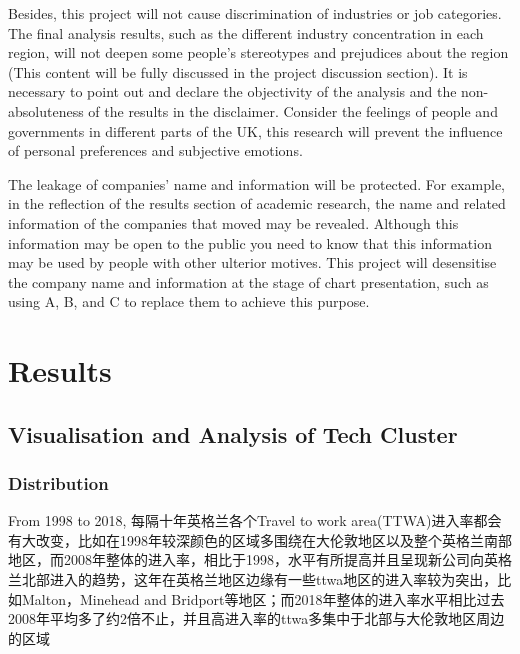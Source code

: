 \documentclass[
  12pt,
  oneside]{book}
\begin{document}
Besides, this project will not cause discrimination of industries or job categories. The final analysis results, such as the different industry concentration in each region, will not deepen some people's stereotypes and prejudices about the region (This content will be fully discussed in the project discussion section). It is necessary to point out and declare the objectivity of the analysis and the non-absoluteness of the results in the disclaimer. Consider the feelings of people and governments in different parts of the UK, this research will prevent the influence of personal preferences and subjective emotions.

The leakage of companies' name and information will be protected. For example, in the reflection of the results section of academic research, the name and related information of the companies that moved may be revealed. Although this information may be open to the public you need to know that this information may be used by people with other ulterior motives. This project will desensitise the company name and information at the stage of chart presentation, such as using A, B, and C to replace them to achieve this purpose.

\hypertarget{results}{%
\chapter{Results}\label{results}}

\hypertarget{visualisation-and-analysis-of-tech-cluster}{%
\section{Visualisation and Analysis of Tech Cluster}\label{visualisation-and-analysis-of-tech-cluster}}

\hypertarget{distribution}{%
\subsection{Distribution}\label{distribution}}

From 1998 to 2018, 每隔十年英格兰各个Travel to work area(TTWA)进入率都会有大改变，比如在1998年较深颜色的区域多围绕在大伦敦地区以及整个英格兰南部地区，而2008年整体的进入率，相比于1998，水平有所提高并且呈现新公司向英格兰北部进入的趋势，这年在英格兰地区边缘有一些ttwa地区的进入率较为突出，比如Malton，Minehead and Bridport等地区；而2018年整体的进入率水平相比过去2008年平均多了约2倍不止，并且高进入率的ttwa多集中于北部与大伦敦地区周边的区域
\end{document}
